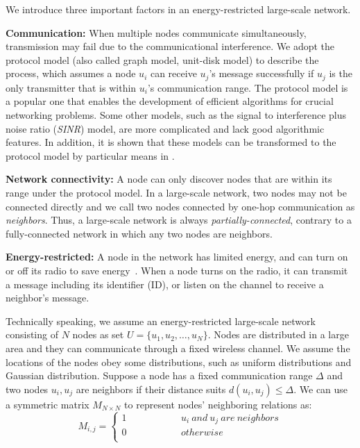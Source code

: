 We introduce three important factors in an energy-restricted large-scale network.

\textbf{Communication:}
When multiple nodes communicate simultaneously, transmission may fail due to the communicational interference. We adopt the protocol model (also called graph model, unit-disk model\cite{moscibroda2006complexity, wang2015connectivity}) to describe the process, which assumes a node $u_i$ can receive $u_j$'s message successfully if $u_j$ is the only transmitter that is within $u_i$'s communication range.
The protocol model is a popular one that enables the development of efficient algorithms for crucial networking problems. Some other models, such as the signal to interference plus noise ratio (\emph{SINR}) model, are more complicated and lack good algorithmic features. In addition, it is shown that these models can be transformed to the protocol model by particular means in \cite{lebhar2009unit}.

\textbf{Network connectivity:}
A node can only discover nodes that are within its range under the protocol model. In a large-scale network, two nodes may not be connected directly and we call two nodes connected by one-hop communication as \emph{neighbors}. Thus, a large-scale network is always \emph{partially-connected}, contrary to a fully-connected network in which any two nodes are neighbors.

\textbf{Energy-restricted:}
A node in the network has limited energy, and can turn on or off its radio to save energy~\cite{dunkels2011contikimac, zhang2017performance}. When a node turns on the radio, it can transmit a message including its identifier (ID), or listen on the channel to receive a neighbor's message.

Technically speaking, we assume an energy-restricted large-scale network consisting of $N$ nodes as set $U=\{u_1,u_2,\ldots,u_N\}$.  Nodes are distributed in a large area and they can communicate through a fixed wireless channel. We assume the locations of the nodes obey some distributions, such as uniform distributions and Gaussian distribution\cite{wang2013gaussian}.
Suppose a node has a fixed communication range $\Delta$ and two nodes $u_i, u_j$ are neighbors if their distance suits $d(u_i, u_j) \leq \Delta$. We can use a symmetric matrix $M_{N\times N}$ to represent nodes' neighboring relations as:
$$ M_{i,j}=\left\{
\begin{aligned}
1  & & & & & & &{u_i ~and~ u_j ~are~ neighbors}\\
0  & & & & & & &{otherwise}\\
\end{aligned}
\right.
$$

